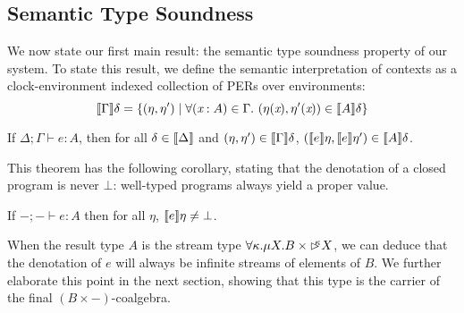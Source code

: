 \subsection{Semantic Type Soundness}\label{sec:semantic-soundness}

We now state our first main result: the semantic type soundness
property of our system. To state this result, we define the semantic
interpretation of contexts as a clock-environment indexed collection
of PERs over environments:
\begin{displaymath}
  \sem{\Gamma}\delta = \{(\eta, \eta') \mathrel| \forall (\ident{x} : A) \in \Gamma.\ (\eta(\ident{x}), \eta'(\ident{x})) \in \sem{A}\delta \}
\end{displaymath}

\begin{theorem}\label{thm:semantic-soundness}
  If $\Delta; \Gamma \vdash e : A$, then for all $\delta \in
  \llbracket \Delta \rrbracket$ and $(\eta,\eta') \in \llbracket \Gamma \rrbracket\delta$,
  $(\llbracket e \rrbracket\eta,\llbracket e \rrbracket\eta') \in \llbracket A \rrbracket\delta$.
\end{theorem}

This theorem has the following corollary, stating that the denotation
of a closed program is never $\bot$: well-typed programs always yield
a proper value.
\begin{corollary}
  If $-; - \vdash e : A$ then for all $\eta$, $\llbracket e \rrbracket\eta \not=
  \bot$.
\end{corollary}
When the result type $A$ is the stream type $\forall \kappa. \mu X. B
\times \mathord{\rhd\kern-0.4em^{\kappa}} X$, we can deduce that the denotation of $e$ will
always be infinite streams of elements of $B$. We further elaborate
this point in the next section, showing that this type is the carrier
of the final $(B \times -)$-coalgebra.

